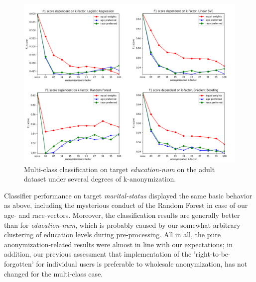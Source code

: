 \documentclass{llncs}
\begin{document}
\begin{figure}[!h]
	\centering
	\includegraphics[width=1\textwidth]{figures/anonymization/adults_education_num/anon_education_combined}
	\caption{Multi-class classification on target \textit{education-num} on the adult dataset under several degrees of k-anonymization.}
	\label{fig:results_anonymization_education_num}
\end{figure}

Classifier performance on target \textit{marital-status} displayed the same basic behavior as above, including the mysterious conduct of the Random Forest in case of our age- and race-vectors. Moreover, the classification results are generally better than for \textit{education-num}, which is probably caused by our somewhat arbitrary clustering of education levels during pre-processing. All in all, the pure anonymization-related results were almost in line with our expectations; in addition, our previous assessment that implementation of the 'right-to-be-forgotten' for individual users is preferable to wholesale anonymization, has not changed for the multi-class case.
\end{document}
